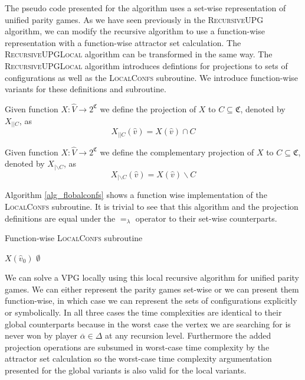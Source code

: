 The pseudo code presented for the algorithm uses a set-wise representation of unified parity games. As we have seen previously in the \textsc{RecursiveUPG} algorithm, we can modify the recursive algorithm to use a function-wise representation with a function-wise attractor set calculation. The \textsc{RecursiveUPGLocal} algorithm can be transformed in the same way. The \textsc{RecursiveUPGLocal} algorithm introduces defintions for projections to sets of configurations as well as the \textsc{LocalConfs} subroutine. We introduce function-wise variants for these definitions and subroutine.
\begin{definition}
	Given function $X : \hat{V} \rightarrow 2^\mathfrak{C}$ we define the projection of $X$ to $C \subseteq \mathfrak{C}$, denoted by $X_{||C}$, as
	\[ X_{||C}(\hat{v}) = X(\hat{v}) \cap C \]
\end{definition}
\begin{definition}
	Given function $X : \hat{V} \rightarrow 2^\mathfrak{C}$ we define the complementary projection of $X$ to $C \subseteq \mathfrak{C}$, denoted by $X_{|\backslash C}$, as
	\[ X_{|\backslash C}(\hat{v}) = X(\hat{v}) \backslash C \]
\end{definition}
Algorithm \ref{alg_flobalconfs} shows a function wise implementation of the \textsc{LocalConfs} subroutine. It is trivial to see that this algorithm and the projection definitions are equal under the $=_\lambda$ operator to their set-wise counterparts.
\begin{algorithm}
	\caption{Function-wise \textsc{LocalConfs} subroutine}
	\label{alg_flobalconfs}
	\begin{algorithmic}[1]
		\If{$\overline{\alpha} \in \Delta$}
		\State \Return $X(\hat{v}_0)$
		\Else
		\State \Return $\emptyset$
		\EndIf
		\EndFunction
	\end{algorithmic}
\end{algorithm}

We can solve a VPG locally using this local recursive algorithm for unified parity games. We can either represent the parity games set-wise or we can present them function-wise, in which case we can represent the sets of configurations explicitly or symbolically. In all three cases the time complexities are identical to their global counterparts because in the worst case the vertex we are searching for is never won by player $\overline{\alpha} \in \Delta$ at any recursion level. Furthermore the added projection operations are subsumed in worst-case time complexity by the attractor set calculation so the worst-case time complexity argumentation presented for the global variants is also valid for the local variants. 